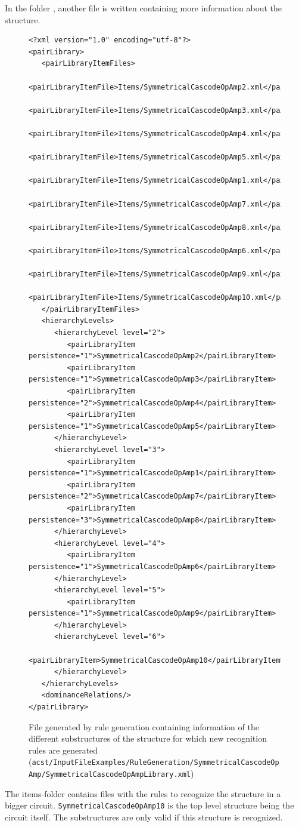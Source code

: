In the folder {\tt <structure-name>}, another file is written containing more information about the structure.
\begin{figure}[H]
	\begin{lstlisting}[basicstyle=\ttfamily\scriptsize,backgroundcolor={\color{gray!30}}, escapechar=? ]
<?xml version="1.0" encoding="utf-8"?>
<pairLibrary>
   <pairLibraryItemFiles>
      <pairLibraryItemFile>Items/SymmetricalCascodeOpAmp2.xml</pairLibraryItemFile>
      <pairLibraryItemFile>Items/SymmetricalCascodeOpAmp3.xml</pairLibraryItemFile>
      <pairLibraryItemFile>Items/SymmetricalCascodeOpAmp4.xml</pairLibraryItemFile>
      <pairLibraryItemFile>Items/SymmetricalCascodeOpAmp5.xml</pairLibraryItemFile>
      <pairLibraryItemFile>Items/SymmetricalCascodeOpAmp1.xml</pairLibraryItemFile>
      <pairLibraryItemFile>Items/SymmetricalCascodeOpAmp7.xml</pairLibraryItemFile>
      <pairLibraryItemFile>Items/SymmetricalCascodeOpAmp8.xml</pairLibraryItemFile>
      <pairLibraryItemFile>Items/SymmetricalCascodeOpAmp6.xml</pairLibraryItemFile>
      <pairLibraryItemFile>Items/SymmetricalCascodeOpAmp9.xml</pairLibraryItemFile>
      <pairLibraryItemFile>Items/SymmetricalCascodeOpAmp10.xml</pairLibraryItemFile>
   </pairLibraryItemFiles>
   <hierarchyLevels>
      <hierarchyLevel level="2">
         <pairLibraryItem persistence="1">SymmetricalCascodeOpAmp2</pairLibraryItem>
         <pairLibraryItem persistence="1">SymmetricalCascodeOpAmp3</pairLibraryItem>
         <pairLibraryItem persistence="2">SymmetricalCascodeOpAmp4</pairLibraryItem>
         <pairLibraryItem persistence="1">SymmetricalCascodeOpAmp5</pairLibraryItem>
      </hierarchyLevel>
      <hierarchyLevel level="3">
         <pairLibraryItem persistence="1">SymmetricalCascodeOpAmp1</pairLibraryItem>
         <pairLibraryItem persistence="2">SymmetricalCascodeOpAmp7</pairLibraryItem>
         <pairLibraryItem persistence="3">SymmetricalCascodeOpAmp8</pairLibraryItem>
      </hierarchyLevel>
      <hierarchyLevel level="4">
         <pairLibraryItem persistence="1">SymmetricalCascodeOpAmp6</pairLibraryItem>
      </hierarchyLevel>
      <hierarchyLevel level="5">
         <pairLibraryItem persistence="1">SymmetricalCascodeOpAmp9</pairLibraryItem>
      </hierarchyLevel>
      <hierarchyLevel level="6">
         <pairLibraryItem>SymmetricalCascodeOpAmp10</pairLibraryItem>
      </hierarchyLevel>
   </hierarchyLevels>
   <dominanceRelations/>
</pairLibrary>
	\end{lstlisting}
\caption{File generated by rule generation containing information of the different substructures of the structure for which new recognition rules are generated ({\tt acst/InputFileExamples/RuleGeneration/SymmetricalCascodeOpAmp/\protect \linebreak SymmetricalCascodeOpAmpLibrary.xml})}
\end{figure}
The items-folder contains files with the rules to recognize the structure in a bigger circuit. {\tt SymmetricalCascodeOpAmp10} is the top level structure being the circuit itself. The substructures are only valid if this structure is recognized.

